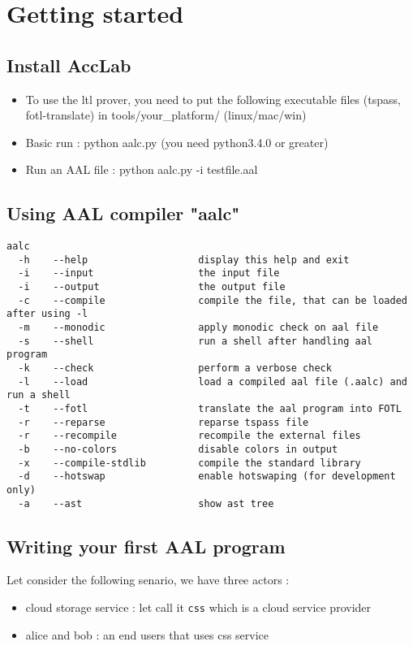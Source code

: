 \section{Getting started}

\subsection{Install AccLab}
\begin{itemize}
  \item To use the ltl prover, you need to put the following executable files (tspass, fotl-translate) in tools/your\_platform/ (linux/mac/win)
  \item Basic run : python aalc.py (you need python3.4.0 or greater)
  \item Run an AAL file : python aalc.py -i testfile.aal
\end{itemize}


\subsection{Using AAL compiler "aalc"}
{\lstset{style=shell}
\begin{lstlisting}[caption={aalc options}]
aalc 
  -h    --help                   display this help and exit
  -i    --input                  the input file
  -i    --output                 the output file
  -c    --compile                compile the file, that can be loaded after using -l
  -m    --monodic                apply monodic check on aal file
  -s    --shell                  run a shell after handling aal program
  -k    --check                  perform a verbose check
  -l    --load                   load a compiled aal file (.aalc) and run a shell
  -t    --fotl                   translate the aal program into FOTL
  -r    --reparse                reparse tspass file
  -r    --recompile              recompile the external files
  -b    --no-colors              disable colors in output
  -x    --compile-stdlib         compile the standard library
  -d    --hotswap                enable hotswaping (for development only)
  -a    --ast                    show ast tree
\end{lstlisting}
}

\subsection{Writing your first AAL program}
Let consider the following senario, we have three actors :
\begin{itemize}
    \item cloud storage service : let call it \texttt{css} which is a cloud service provider
    \item alice and bob : an end users that uses css service
\end{itemize}

